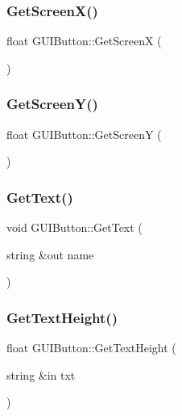 \subsubsection{\texorpdfstring{Get\+Screen\+X()}{GetScreenX()}}
{\footnotesize\ttfamily float G\+U\+I\+Button\+::\+Get\+ScreenX (\begin{DoxyParamCaption}{ }\end{DoxyParamCaption})}

\hypertarget{class_g_u_i_button_a98a966e695a669d884228ff339953044}{}\label{class_g_u_i_button_a98a966e695a669d884228ff339953044} 
\subsubsection{\texorpdfstring{Get\+Screen\+Y()}{GetScreenY()}}
{\footnotesize\ttfamily float G\+U\+I\+Button\+::\+Get\+ScreenY (\begin{DoxyParamCaption}{ }\end{DoxyParamCaption})}

\hypertarget{class_g_u_i_button_aa00bd2a11590b1e8edc33c66fb8e1b7e}{}\label{class_g_u_i_button_aa00bd2a11590b1e8edc33c66fb8e1b7e} 
\subsubsection{\texorpdfstring{Get\+Text()}{GetText()}}
{\footnotesize\ttfamily void G\+U\+I\+Button\+::\+Get\+Text (\begin{DoxyParamCaption}\item[{string \&out}]{name }\end{DoxyParamCaption})}

\hypertarget{class_g_u_i_button_a092ffb06d53586ef0e7cd27c503abe59}{}\label{class_g_u_i_button_a092ffb06d53586ef0e7cd27c503abe59} 
\subsubsection{\texorpdfstring{Get\+Text\+Height()}{GetTextHeight()}}
{\footnotesize\ttfamily float G\+U\+I\+Button\+::\+Get\+Text\+Height (\begin{DoxyParamCaption}\item[{string \&in}]{txt }\end{DoxyParamCaption})}

